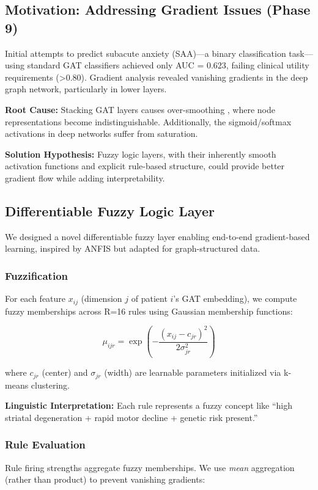 \documentclass[conference]{IEEEtran}
\begin{document}
\subsection{Motivation: Addressing Gradient Issues (Phase 9)}

Initial attempts to predict subacute anxiety (SAA)---a binary classification task---using standard GAT classifiers achieved only AUC = 0.623, failing clinical utility requirements (>0.80). Gradient analysis revealed vanishing gradients in the deep graph network, particularly in lower layers.

\textbf{Root Cause:} Stacking GAT layers causes over-smoothing \cite{li2018deeper}, where node representations become indistinguishable. Additionally, the sigmoid/softmax activations in deep networks suffer from saturation.

\textbf{Solution Hypothesis:} Fuzzy logic layers, with their inherently smooth activation functions and explicit rule-based structure, could provide better gradient flow while adding interpretability.

\subsection{Differentiable Fuzzy Logic Layer}

We designed a novel differentiable fuzzy layer enabling end-to-end gradient-based learning, inspired by ANFIS \cite{jang1993anfis} but adapted for graph-structured data.

\subsubsection{Fuzzification}
For each feature $x_{ij}$ (dimension $j$ of patient $i$'s GAT embedding), we compute fuzzy memberships across R=16 rules using Gaussian membership functions:

\begin{equation}
\mu_{ijr} = \exp\left(-\frac{(x_{ij} - c_{jr})^2}{2\sigma_{jr}^2}\right)
\end{equation}

where $c_{jr}$ (center) and $\sigma_{jr}$ (width) are learnable parameters initialized via k-means clustering.

\textbf{Linguistic Interpretation:} Each rule represents a fuzzy concept like ``high striatal degeneration + rapid motor decline + genetic risk present.''

\subsubsection{Rule Evaluation}
Rule firing strengths aggregate fuzzy memberships. We use \textit{mean} aggregation (rather than product) to prevent vanishing gradients:
\end{document}
